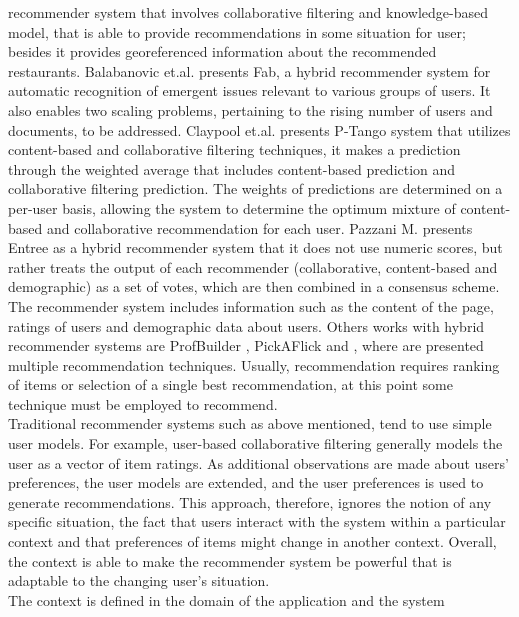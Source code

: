 recommender system that involves collaborative filtering and
knowledge-based model, that is able to provide recommendations in some
situation for user; besides it provides georeferenced information
about the recommended restaurants.
Balabanovic et.al.\cite{balabanovic1997fab} presents
Fab, a hybrid recommender system for automatic recognition of
emergent issues relevant to various groups of users. It also enables
two scaling problems, pertaining to the rising number of users and
documents, to be addressed. Claypool et.al.\cite{claypool1999combining} 
presents P-Tango system that utilizes content-based and collaborative
filtering techniques, it makes a prediction through the weighted
average that includes content-based prediction and collaborative
filtering prediction. The weights of predictions are determined on a
per-user basis, allowing the system to determine the optimum mixture
of content-based and collaborative recommendation for each user.
Pazzani M.\cite{pazzani1999framework} presents Entree as a hybrid
recommender system that it does not use numeric scores, but rather
treats the output of each recommender (collaborative, content-based
and demographic) as a set of votes, which are then combined in a
consensus scheme. The recommender system includes information such as
the content of the page, ratings of users and demographic data about
users. 
Others works with hybrid recommender systems are ProfBuilder
\cite{al1999semantic}, PickAFlick\cite{burke1999integrating}  and
\cite{tran2000hybrid}, where are presented multiple recommendation
techniques. Usually, recommendation requires ranking of
items or selection of a single best recommendation, at this point some
technique must be employed to recommend. \\ 
Traditional recommender systems such as above mentioned, tend to use
simple user models. For example, user-based collaborative filtering
generally models the user as a vector of item ratings. As additional
observations are made about users’ preferences, the user models are
extended, and the user preferences is used to generate
recommendations. This approach, therefore, ignores the notion of any
specific situation, the fact that users interact with the system
within a particular context and  that preferences of items might 
change in another context.  
Overall, the context is able to make the recommender system be 
powerful that is adaptable to the changing user's situation.\\
The context is defined in the domain of the application and the system

